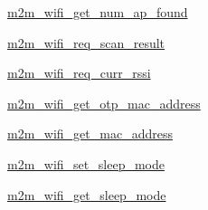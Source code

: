 \begin{DoxyCompactItemize}
\item 
\hyperlink{group__WifiGetNumAPFoundFn}{m2m\+\_\+wifi\+\_\+get\+\_\+num\+\_\+ap\+\_\+found}
\item 
\hyperlink{group__WifiReqScanResult}{m2m\+\_\+wifi\+\_\+req\+\_\+scan\+\_\+result}
\item 
\hyperlink{group__WifiReqCurrentRssiFn}{m2m\+\_\+wifi\+\_\+req\+\_\+curr\+\_\+rssi}
\item 
\hyperlink{group__WifiGetOtpMacAddFn}{m2m\+\_\+wifi\+\_\+get\+\_\+otp\+\_\+mac\+\_\+address}
\item 
\hyperlink{group__WifiGetMacAddFn}{m2m\+\_\+wifi\+\_\+get\+\_\+mac\+\_\+address}
\item 
\hyperlink{group__SetSleepModeFn}{m2m\+\_\+wifi\+\_\+set\+\_\+sleep\+\_\+mode}
\item 
\hyperlink{group__GetSleepModeFn}{m2m\+\_\+wifi\+\_\+get\+\_\+sleep\+\_\+mode}
\end{DoxyCompactItemize}

